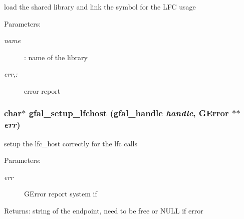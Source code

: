 load the shared library and link the symbol for the LFC usage \begin{Desc}
\item[Parameters:]
\begin{description}
\item[{\em name}]: name of the library \item[{\em err,:}]error report \end{description}
\end{Desc}
\subsubsection{\setlength{\rightskip}{0pt plus 5cm}char$\ast$ gfal\_\-setup\_\-lfchost (gfal\_\-handle {\em handle}, GError $\ast$$\ast$ {\em err})}\label{lfc__ifce__ng_8c_5d13dc09e91f66d74de768c2e4bf4872}


setup the lfc\_\-host correctly for the lfc calls \begin{Desc}
\item[Parameters:]
\begin{description}
\item[{\em err}]GError report system if \end{description}
\end{Desc}
\begin{Desc}
\item[Returns:]string of the endpoint, need to be free or NULL if error \end{Desc}
